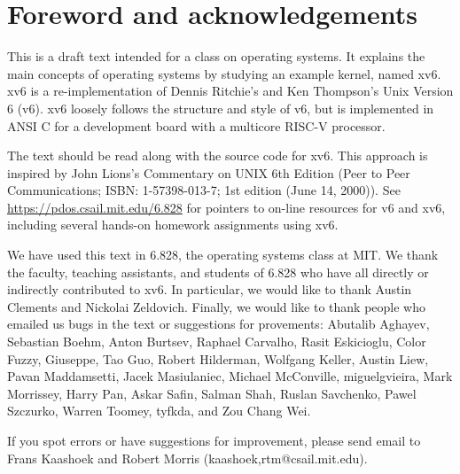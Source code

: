 \chapter*{Foreword and acknowledgements}


This is a draft text intended for a class on operating systems. It
explains the main concepts of operating systems by studying an example
kernel, named xv6.  xv6 is a re-implementation of Dennis Ritchie's and
Ken Thompson's Unix Version 6 (v6).  xv6 loosely follows the structure
and style of v6, but is implemented in ANSI C for a development board
with a multicore RISC-V processor.

The text should be read along with the source code for xv6. This approach is
inspired by John Lions's Commentary on UNIX 6th Edition (Peer to Peer
Communications; ISBN: 1-57398-013-7; 1st edition (June 14, 2000)). See
\url{https://pdos.csail.mit.edu/6.828} for pointers to on-line
resources for v6 and xv6, including several hands-on homework assignments
using xv6.

We have used this text in 6.828, the operating systems class at MIT.  We thank
the faculty, teaching assistants, and students of 6.828 who have all directly or
indirectly contributed to xv6.  In particular, we would like to thank Austin
Clements and Nickolai Zeldovich.  Finally, we would like to thank people who
emailed us bugs in the text or suggestions for provements: Abutalib Aghayev,
Sebastian Boehm, Anton Burtsev, Raphael Carvalho, Rasit Eskicioglu, Color Fuzzy,
Giuseppe, Tao Guo, Robert Hilderman, Wolfgang Keller, Austin Liew, Pavan
Maddamsetti, Jacek Masiulaniec, Michael McConville, miguelgvieira, Mark
Morrissey, Harry Pan, Askar Safin, Salman Shah, Ruslan Savchenko, Pawel
Szczurko, Warren Toomey, tyfkda, and Zou Chang Wei.

If you spot errors or have suggestions for improvement, please send email to
Frans Kaashoek and Robert Morris (kaashoek,rtm@csail.mit.edu).
